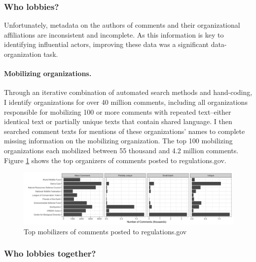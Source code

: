\documentclass[
      12pt,
        ]{article}
\begin{document}
\hypertarget{who-lobbies}{%
\subsubsection{Who lobbies?}\label{who-lobbies}}

Unfortunately, metadata on the authors of comments and their
organizational affiliations are inconsistent and incomplete. As this
information is key to identifying influential actors, improving these
data was a significant data-organization task.

\hypertarget{mobilizing-organizations.}{%
\paragraph{Mobilizing organizations.}\label{mobilizing-organizations.}}

Through an iterative combination of automated search methods and hand-coding, I identify organizations for over 40 million comments, including all organizations responsible for mobilizing 100 or more
comments with repeated text--either identical text or partially unique
texts that contain shared language. I then searched comment texts for
mentions of these organizations' names to complete missing information
on the mobilizing organization. The top 100 mobilizing organizations
each mobilized between 55 thousand and 4.2 million comments. Figure
\ref{fig:toporgs} shows the top organizers of comments posted to
regulations.gov.

\begin{figure}

{\centering \includegraphics[width=6.5in]{../Figs/toporgs} 

}

\caption{Top mobilizers of comments posted to regulations.gov}\label{fig:toporgs}
\end{figure}

\hypertarget{who-lobbies-together}{%
\subsubsection{Who lobbies together?}\label{who-lobbies-together}}
\end{document}
